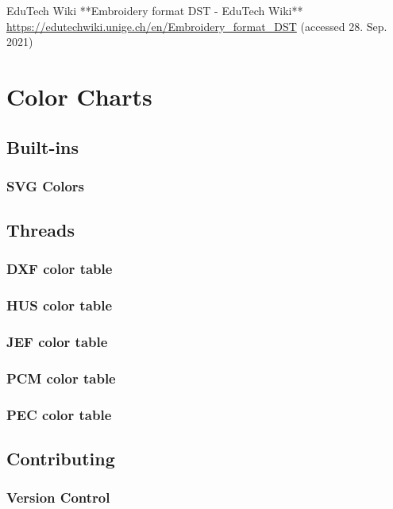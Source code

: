 \documentclass[10pt]{report}
\begin{document}
EduTech Wiki
**Embroidery format DST - EduTech Wiki**
\url{https://edutechwiki.unige.ch/en/Embroidery_format_DST}
(accessed 28. Sep. 2021)

\chapter{Color Charts}

\section{Built-ins}

\subsection{SVG Colors}

\section{Threads}

\subsection{DXF color table}

\subsection{HUS color table}

\subsection{JEF color table}

\subsection{PCM color table}

\subsection{PEC color table}

\section{Contributing}

\subsection{Version Control}
\end{document}
